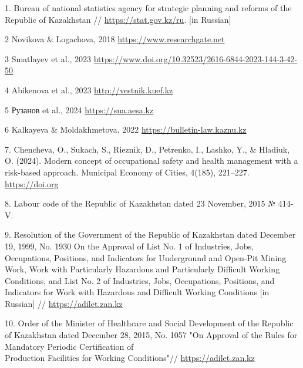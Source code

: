 \begin{references}
1. Bureau of national statistics agency for strategic planning and
reforms of the Republic of Kazakhstan //
\href{https://stat.gov.kz/ru}{https://stat.gov.kz/ru}. {[}in Russian{]}

2 Novikova \& Logachova, 2018 \href{https://www.researchgate.net/publication/328605049_Social_guarantees_for_persons_employed_in_industry_on_labour_conditions}{https://www.researchgate.net}

3 Smatlayev et al., 2023
\href{https://www.doi.org/10.32523/2616-6844-2023-144-3-42-50}{https://www.doi.org/10.32523/2616-6844-2023-144-3-42-50}

4 Abikenova et al., 2023
\href{http://vestnik.kuef.kz/web/uploads/file-vestnik/355030862d39f301e86c59a3e880429a.pdf}{http://vestnik.kuef.kz}

5 Рузанов et al., 2024
\href{https://sua.aesa.kz/main/article/view/222/192}{https://sua.aesa.kz}

6 Kalkayeva \& Moldakhmetova, 2022
\href{https://bulletin-law.kaznu.kz/index.php/journal/article/view/2663}{https://bulletin-law.kaznu.kz}

7. Chencheva, O., Sukach, S., Rieznik, D., Petrenko, I., Lashko, Y., \&
Hladiuk, O. (2024). Modern concept of occupational safety and health
management with a risk-based approach. Municipal Economy of Cities,
4(185), 221--227.
\href{https://doi.org/10.33042/2522-1809-2024-4-185-221-227}{https://doi.org}

8. Labour code of the Republic of Kazakhstan dated 23 November, 2015 №
414-V.

9. Resolution of the Government of the Republic of Kazakhstan dated
December 19, 1999, No. 1930 On the Approval of List No. 1 of Industries,
Jobs, Occupations, Positions, and Indicators for Underground and
Open-Pit Mining Work, Work with Particularly Hazardous and Particularly
Difficult Working Conditions, and List No. 2 of Industries, Jobs,
Occupations, Positions, and Indicators for Work with Hazardous and
Difficult Working Conditions {[}in Russian{]} //
\href{https://adilet.zan.kz/rus/docs/P990001930_/history}{https://adilet.zan.kz}

10. Order of the Minister of Healthcare and Social Development of the
Republic of Kazakhstan dated December 28, 2015, No. 1057 "On Approval of
the Rules for Mandatory Periodic Certification of \\Production Facilities
for Working Conditions"//
\href{https://adilet.zan.kz/rus/docs/V1500012743}{https://adilet.zan.kz}


\end{references}
